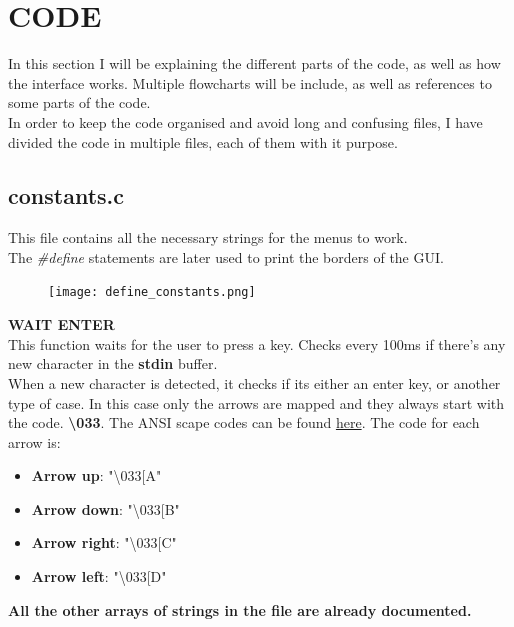 \documentclass[14pt]{article}
\begin{document}
	\section{CODE}
	\begin{normalsize}
		In this section I will be explaining the different parts of the code, as well as how the interface works. Multiple flowcharts will be include, as well as references to some parts of the code.\\
		
		In order to keep the code organised and avoid long and confusing files, I have divided the code in multiple files, each of them with it purpose. 
		\subsection{constants.c}
		This file contains all the necessary strings for the menus to work. \\
		The \textit{\#define} statements are later used to print the borders of the GUI.
		
		\begin{figure}[h]
			\centering
			\texttt{[image: define\_constants.png]}
		\end{figure}
		\vspace{20pt}		
		\noindent\large \textbf{WAIT ENTER}\normalsize\\
		This function waits for the user to press a key. Checks every 100ms if there's any new character in the \textbf{stdin} buffer. \\
		
		When a new character is detected, it checks if its either an enter key, or another type of case. In this case only the arrows are mapped and they always start with the code. \textbf{\textbackslash033}. The ANSI scape codes can be found \href{https://en.wikipedia.org/wiki/ANSI_escape_code}{here}. The code for each arrow is:
		\begin{itemize}
			\item \textbf{Arrow up}: "\textbackslash033[A"
			\item \textbf{Arrow down}: "\textbackslash033[B"
			\item \textbf{Arrow right}: "\textbackslash033[C"
			\item \textbf{Arrow left}: "\textbackslash033[D"
		\end{itemize}
		
		\noindent \textbf{All the other arrays of strings in the file are already documented.}
		

\end{normalsize}
\end{document}
